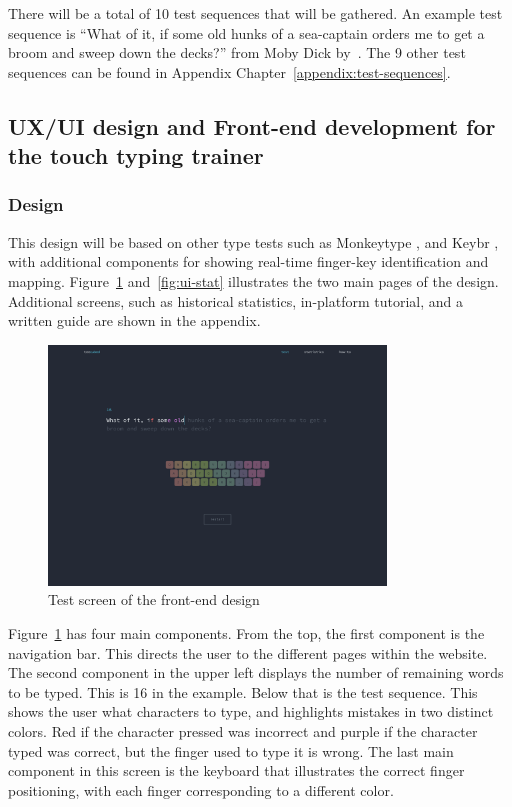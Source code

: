 \documentclass{report}
\begin{document}
There will be a total of 10 test sequences that will be gathered. An example
test sequence is ``What of it, if some old hunks of a sea-captain orders me to
get a broom and sweep down the decks?'' from Moby Dick by~\cite{moby-dick}. The
9 other test sequences can be found in Appendix
Chapter~\ref{appendix:test-sequences}.

\subsection{UX/UI design and Front-end development for the touch typing trainer}
\subsubsection{Design}
This design will be based on other type tests such as Monkeytype
\parencite{bartnik2021}, and Keybr \parencite{keybr}, with additional components
for showing real-time finger-key identification and mapping.
Figure~\ref{fig:ui-test} and~\ref{fig:ui-stat} illustrates the two main pages of
the design. Additional screens, such as historical statistics, in-platform
tutorial, and a written guide are shown in the appendix.

\begin{figure}[H]
	\centering
	\includegraphics[width=0.8\textwidth]{ui-test.png}
	\caption{Test screen of the front-end design}
	\label{fig:ui-test}
	\centering
\end{figure}

Figure~\ref{fig:ui-test} has four main components. From the top, the first
component is the navigation bar. This directs the user to the different pages
within the website. The second component in the upper left displays the number
of remaining words to be typed. This is 16 in the example. Below that is the
test sequence. This shows the user what characters to type, and highlights
mistakes in two distinct colors. Red if the character pressed was incorrect and
purple if the character typed was correct, but the finger used to type it is
wrong. The last main component in this screen is the keyboard that illustrates
the correct finger positioning, with each finger corresponding to a different
color.
\end{document}
